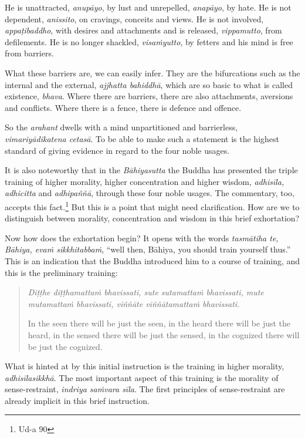 He is unattracted, \emph{anupāyo}, by lust and unrepelled, \emph{anapāyo}, by hate. He is not dependent, \emph{anissito}, on cravings, conceits and views. He is not involved, \emph{appaṭibaddho}, with desires and attachments and is released, \emph{vippamutto}, from defilements. He is no longer shackled, \emph{visaṁyutto}, by fetters and his mind is free from barriers.

What these barriers are, we can easily infer. They are the bifurcations such as the internal and the external, \emph{ajjhatta bahiddhā}, which are so basic to what is called existence, \emph{bhava}. Where there are barriers, there are also attachments, aversions and conflicts. Where there is a fence, there is defence and offence.

So the \emph{arahant} dwells with a mind unpartitioned and barrierless, \emph{vimariyādikatena cetasā}. To be able to make such a statement is the highest standard of giving evidence in regard to the four noble usages.

It is also noteworthy that in the \emph{Bāhiyasutta} the Buddha has presented the triple training of higher morality, higher concentration and higher wisdom, \emph{adhisīla, adhicitta} and \emph{adhipaññā}, through these four noble usages. The commentary, too, accepts this fact.\footnote{Ud-a 90} But this is a point that might need clarification. How are we to distinguish between morality, concentration and wisdom in this brief exhortation?

Now how does the exhortation begin? It opens with the words \emph{tasmātiha te, Bāhiya, evaṁ sikkhitabbaṁ}, ``well then, Bāhiya, you should train yourself thus.'' This is an indication that the Buddha introduced him to a course of training, and this is the preliminary training:

\begin{quote}
\emph{Diṭṭhe diṭṭhamattaṁ bhavissati, sute sutamattaṁ bhavissati, mute mutamattaṁ bhavissati, viññāte viññātamattaṁ bhavissati.}

In the seen there will be just the seen, in the heard there will be just the heard, in the sensed there will be just the sensed, in the cognized there will be just the cognized.
\end{quote}

What is hinted at by this initial instruction is the training in higher morality, \emph{adhisīlasikkhā}. The most important aspect of this training is the morality of sense-restraint, \emph{indriya saṁvara sīla}. The first principles of sense-restraint are already implicit in this brief instruction.

